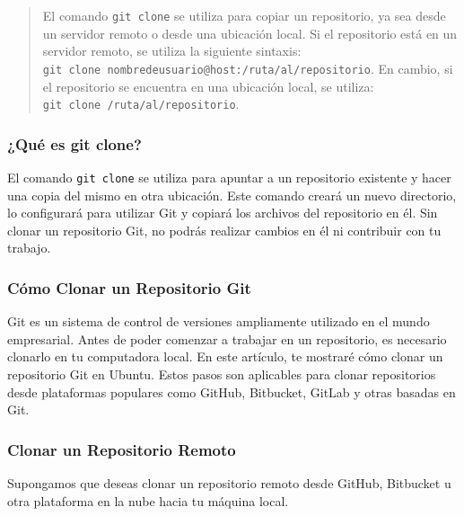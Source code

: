 \documentclass[
  a4paper,
]{article}
\begin{document}
\begin{quote}
El comando \texttt{git\ clone} se utiliza para copiar un repositorio, ya
sea desde un servidor remoto o desde una ubicación local. Si el
repositorio está en un servidor remoto, se utiliza la siguiente
sintaxis:
\texttt{git\ clone\ nombredeusuario@host:/ruta/al/repositorio}. En
cambio, si el repositorio se encuentra en una ubicación local, se
utiliza: \texttt{git\ clone\ /ruta/al/repositorio}.
\end{quote}

\subsubsection{¿Qué es git clone?}\label{quuxe9-es-git-clone}

El comando \texttt{git\ clone} se utiliza para apuntar a un repositorio
existente y hacer una copia del mismo en otra ubicación. Este comando
creará un nuevo directorio, lo configurará para utilizar Git y copiará
los archivos del repositorio en él. Sin clonar un repositorio Git, no
podrás realizar cambios en él ni contribuir con tu trabajo.

\subsubsection{Cómo Clonar un Repositorio
Git}\label{cuxf3mo-clonar-un-repositorio-git}

Git es un sistema de control de versiones ampliamente utilizado en el
mundo empresarial. Antes de poder comenzar a trabajar en un repositorio,
es necesario clonarlo en tu computadora local. En este artículo, te
mostraré cómo clonar un repositorio Git en Ubuntu. Estos pasos son
aplicables para clonar repositorios desde plataformas populares como
GitHub, Bitbucket, GitLab y otras basadas en Git.

\subsubsection{Clonar un Repositorio
Remoto}\label{clonar-un-repositorio-remoto}

Supongamos que deseas clonar un repositorio remoto desde GitHub,
Bitbucket u otra plataforma en la nube hacia tu máquina local.
\end{document}
